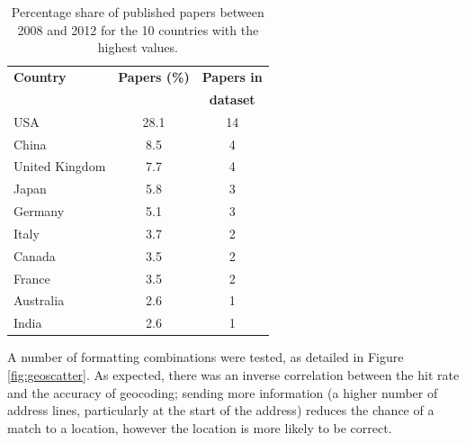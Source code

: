 \documentclass[Report.tex]{subfiles}
\begin{document}
\begin{table}
\begin{center}
    \begin{tabular}{ | l | c | c | }\hline
    \textbf{Country} & \textbf{Papers (\%)} & \textbf{Papers in} \\
     & &\textbf{dataset}\\ \hline
    USA & 28.1 & 14\\ \hline
    China & 8.5 & 4\\ \hline
    United Kingdom & 7.7 & 4\\ \hline
    Japan & 5.8 & 3\\ \hline
    Germany & 5.1 & 3\\ \hline
    Italy & 3.7 & 2\\ \hline
    Canada & 3.5 & 2\\ \hline
    France & 3.5 & 2\\ \hline
    Australia & 2.6 & 1\\ \hline
    India & 2.6 & 1\\ \hline
    \end{tabular}
    \caption{Percentage share of published papers between 2008 and 2012 for the 10 countries with the highest values.\label{tab:countries}}
\end{center}
\end{table}

\noindent A number of formatting combinations were tested, as detailed in Figure \ref{fig:geoscatter}. As expected, there was an inverse correlation between the hit rate and the accuracy of geocoding; sending more information (a higher number of address lines, particularly at the start of the address) reduces the chance of a match to a location, however the location is more likely to be correct.\newline
\end{document}
